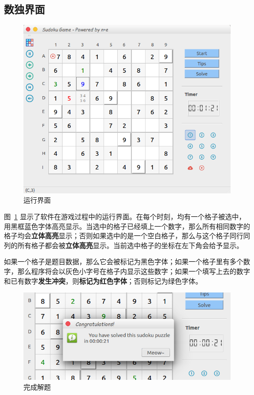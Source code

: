\documentclass[a4paper]{article}
\begin{document}
\subsection{数独界面}
\begin{figure}[htp]
\centering
\includegraphics[width=1\linewidth]{status.png}
\caption{运行界面}
\label{fig:status}
\end{figure}

图~\ref{fig:status} 显示了软件在游戏过程中的运行界面。在每个时刻，均有一个格子被选中，用黑框蓝色字体高亮显示。当选中的格子已经填上一个数字，那么所有相同数字的格子均会{\bf 立体高亮}显示；否则如果选中的是一个空白格子，那么与这个格子同行同列的所有格子都会被{\bf 立体高亮}显示。当前选中格子的坐标在左下角会给予显示。

如果一个格子是题目数据，那么它会被标记为黑色字体；如果一个格子里有多个数字，那么程序将会以灰色小字号在格子内显示这些数字；如果一个填写上去的数字和已有数字{\bf 发生冲突}，则{\bf 标记为红色字体}；否则标记为绿色字体。

\begin{figure}[htp]
\centering
\includegraphics[width=0.7\linewidth]{finish.png}
\caption{完成解题}
\label{fig:finish}
\end{figure}
\end{document}
